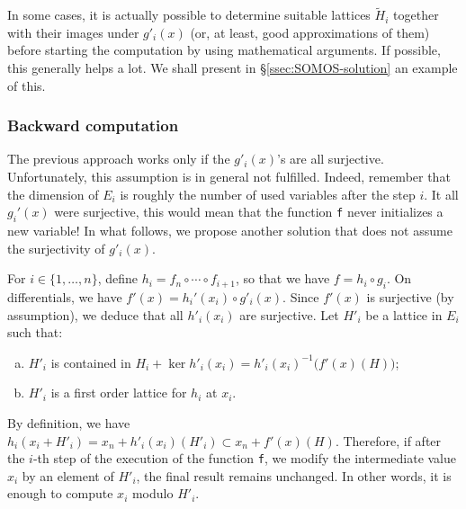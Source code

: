 \documentclass{lms}
\begin{document}
\begin{rmk}
In some cases, it is actually possible to determine suitable lattices 
$\tilde H_i$ together with their images under $g'_i(x)$ (or, at
least, good approximations of them) before starting the computation 
by using mathematical arguments. If possible, this generally helps a
lot. We shall present in \S \ref{ssec:SOMOS-solution} an example of 
this.
\end{rmk}

\subsubsection*{Backward computation}

The previous approach works only if the $g'_i(x)$'s are all surjective. 
Unfortunately, this assumption is in general not fulfilled. Indeed, 
remember that the dimension of $E_i$ is roughly the number of used 
variables after the step $i$. It all $g_i'(x)$ were surjective, this 
would mean that the function {\tt f} never initializes a new variable!
In what follows, we propose another solution that does not assume the
surjectivity of $g'_i(x)$.

For $i \in \{1, \ldots, n\}$, define $h_i = f_n \circ \cdots \circ 
f_{i+1}$, so that we have $f = h_i \circ g_i$. On differentials, we 
have $f'(x) = h_i'(x_i) \circ g'_i(x)$. Since $f'(x)$ is surjective (by 
assumption), we deduce that all $h'_i(x_i)$ are surjective. Let $H'_i$ 
be a lattice in $E_i$ such that:
\begin{enumerate}[(a)] 
\item \label{item:Hi1}
$H'_i$ is contained in $H_i + \ker h'_i(x_i) = h'_i(x_i)^{-1}
\big(f'(x)(H)\big)$;
\item \label{item:Hi2}
$H'_i$ is a first order lattice for $h_i$ at $x_i$.
\end{enumerate}
By definition, we have
$h_i(x_i + H'_i) = x_n + h'_i(x_i)(H'_i) \subset x_n + f'(x)(H)$.
Therefore, if after the $i$-th step of the execution of the function
{\tt f}, we modify the intermediate value $x_i$ by an element of
$H'_i$, the final result remains unchanged. In other words, it is
enough to compute $x_i$ modulo $H'_i$.
\end{document}
